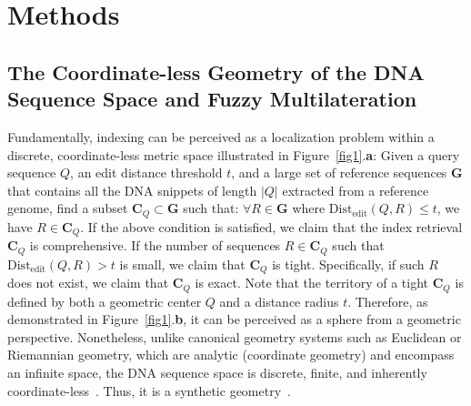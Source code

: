 \documentclass[unnumsec,webpdf,contemporary,large]{oup-authoring-template}%
\theoremstyle{thmstyleone}%
\theoremstyle{thmstyletwo}%
\theoremstyle{thmstylethree}%
\begin{document}



\section{Methods}

\subsection{The Coordinate-less Geometry of the DNA Sequence Space and Fuzzy Multilateration} 

Fundamentally, indexing can be perceived as a localization problem within a discrete, coordinate-less metric space illustrated in Figure~\ref{fig1}.\textbf{a}: 
Given a query sequence $Q$, an edit distance threshold $t$, and a large set of reference sequences $\textbf{G}$ that contains all the DNA snippets of length $|Q|$ extracted from a reference genome, 
find a subset $\textbf{C}_Q \subset \textbf{G}$ such that: $\forall R \in \textbf{G}$ where $\mathrm{Dist}_{\mathrm{edit}}(Q, R) \leq t$, we have $R \in \textbf{C}_Q$.
If the above condition is satisfied, we claim that the index retrieval $\textbf{C}_Q$ is comprehensive.
If the number of sequences $R \in \textbf{C}_Q$ such that $\mathrm{Dist}_{\mathrm{edit}}(Q, R) > t$ is small, we claim that $\textbf{C}_Q$ is tight. 
Specifically, if such $R$ does not exist, we claim that $\textbf{C}_Q$ is exact.
Note that the territory of a tight $\textbf{C}_Q$ is defined by both a geometric center $Q$ and a distance radius $t$.
Therefore, as demonstrated in Figure~\ref{fig1}.\textbf{b}, it can be perceived as a sphere from a geometric perspective.
Nonetheless, unlike canonical geometry systems such as Euclidean or Riemannian geometry, which are analytic (coordinate geometry) and encompass an infinite space,
the DNA sequence space is discrete, finite, and inherently coordinate-less~\citep{de2008computational}.
Thus, it is a synthetic geometry~\citep{bertrand2021stratified, mondino2025equivalence}.
\end{document}
